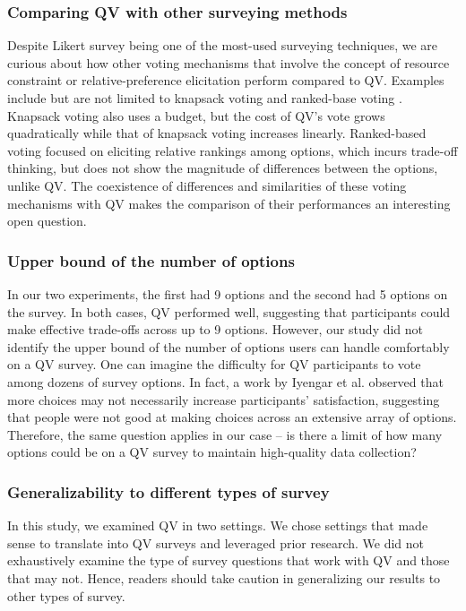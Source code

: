 \subsubsection{Comparing QV with other surveying methods}
Despite Likert survey being one of the most-used surveying techniques, we are curious about how other voting mechanisms that involve the concept of resource constraint or relative-preference elicitation perform compared to QV. Examples include but are not limited to knapsack voting \cite{goel2015knapsack} and ranked-base voting \cite{ledo2018evaluation}. Knapsack voting also uses a budget, but the cost of QV's vote grows quadratically while that of knapsack voting increases linearly. Ranked-based voting focused on eliciting relative rankings among options, which incurs trade-off thinking, but does not show the magnitude of differences between the options, unlike QV. The coexistence of differences and similarities of these voting mechanisms with QV makes the comparison of their performances an interesting open question.

\subsubsection{Upper bound of the number of options}

In our two experiments, the first had 9 options and the second had 5 options on the survey. In both cases, QV performed well, suggesting that participants could make effective trade-offs across up to 9 options. However, our study did not identify the upper bound of the number of options users can handle comfortably on a QV survey. One can imagine the difficulty for QV participants to vote among dozens of survey options. In fact, a work by Iyengar et al. \cite{iyengar2000choice} observed that more choices may not necessarily increase participants' satisfaction, suggesting that people were not good at making choices across an extensive array of options. Therefore, the same question applies in our case -- is there a limit of how many options could be on a QV survey to maintain high-quality data collection?

\subsubsection{Generalizability to different types of survey}
In this study, we examined QV in two settings. We chose settings that made sense to translate into QV surveys and leveraged prior research. We did not exhaustively examine the type of survey questions that work with QV and those that may not. Hence, readers should take caution in generalizing our results to other types of survey.

